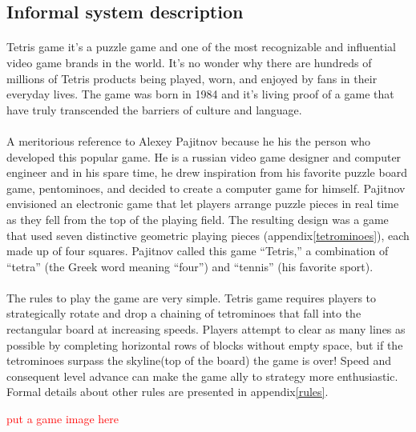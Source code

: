 \documentclass[a4paper]{article}
\begin{document}
\subsection{Informal system description}
\label{informal-rules}

\paragraph{ }Tetris game it's a puzzle game and one of the most recognizable and influential video game brands in the world. It’s no wonder why there are hundreds of millions of Tetris products being played, worn, and enjoyed by fans in their everyday lives. The game was born in 1984 and it's living proof of a game that have truly transcended the barriers of culture and language.

\paragraph{ }A meritorious reference to Alexey Pajitnov because he his the person who developed this popular game. He is a russian video game designer and computer engineer and in his spare time, he drew inspiration from his favorite puzzle board game, pentominoes, and decided to create a computer game for himself. Pajitnov envisioned an electronic game that let players arrange puzzle pieces in real time as they fell from the top of the playing field. The resulting design was a game that used seven distinctive geometric playing pieces (appendix\ref{tetrominoes}), each made up of four squares. Pajitnov called this game “Tetris,” a combination of “tetra” (the Greek word meaning “four”) and “tennis” (his favorite sport).

\paragraph{ }The rules to play the game are very simple. Tetris game requires players to strategically rotate and drop a chaining of tetrominoes that fall into the rectangular board at increasing speeds. Players attempt to clear as many lines as possible by completing horizontal rows of blocks without empty space, but if the tetrominoes surpass the skyline(top of the board) the game is over! Speed and consequent level advance can make the game ally to strategy more enthusiastic. Formal details about other rules are presented in appendix\ref{rules}.

\textcolor{red}{put a game image here}
\end{document}

